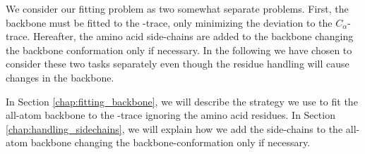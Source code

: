 We consider our fitting problem as two somewhat separate problems.
First, the backbone must be fitted to the \Ca-trace, only minimizing
the deviation to the $C_{\alpha}$-trace.  Hereafter, the amino acid
side-chains are added to the backbone changing the backbone
conformation only if necessary.  In the following we have chosen to
consider these two tasks separately even though the residue handling
will cause changes in the backbone.

In Section \ref{chap:fitting_backbone}, we will describe the strategy we use to fit the all-atom backbone to the \Ca-trace ignoring the amino acid residues.
In Section \ref{chap:handling_sidechains}, we will explain how we add the side-chains to the all-atom backbone changing the backbone-conformation only if necessary.

